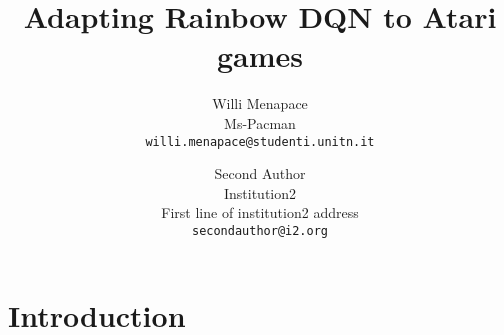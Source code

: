 \documentclass[10pt,twocolumn,letterpaper]{article}
\begin{document}
\title{Adapting Rainbow DQN to Atari games}

\author{Willi Menapace\\
Ms-Pacman\\
{\tt\small willi.menapace@studenti.unitn.it}
\and
Second Author\\
Institution2\\
First line of institution2 address\\
{\tt\small secondauthor@i2.org}
}

\maketitle



\section{Introduction}
\end{document}
